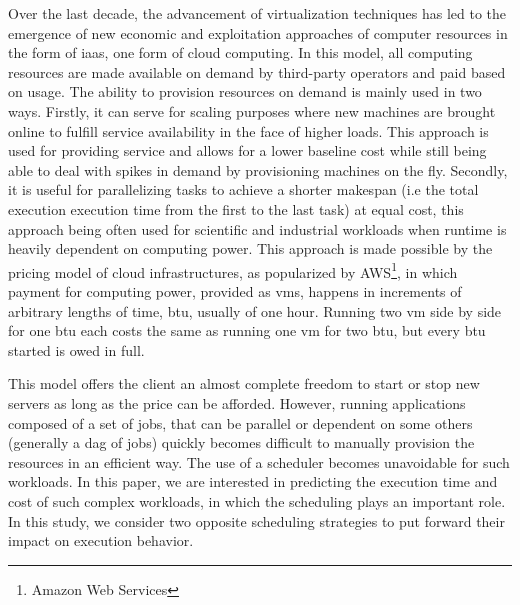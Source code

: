 \documentclass[10pt,conference,compsocconf]{IEEEtran}
\begin{document}
Over the  last decade, the advancement  of virtualization techniques has  led to
the emergence of new economic  and exploitation approaches of computer resources
in  the form  of \ac{iaas},  one form  of cloud  computing. In  this model,  all
computing resources  are made available  on demand by third-party  operators and
paid based  on usage.  The  ability to provision  resources on demand  is mainly
used in two ways.  Firstly, it can serve for scaling purposes where new machines
are  brought online  to  fulfill  service availability  in  the  face of  higher
loads.  This approach  is used  for  providing service  and allows  for a  lower
baseline  cost  while  still  being  able  to deal  with  spikes  in  demand  by
provisioning machines on the fly. Secondly, it is useful for parallelizing tasks
to achieve a  shorter makespan (i.e the total execution  execution time from the
first  to the  last task)  at equal  cost, this  approach being  often used  for
scientific  and  industrial  workloads  when runtime  is  heavily  dependent  on
computing power.  This  approach is made possible by the  pricing model of cloud
infrastructures, as  popularized by AWS\footnote{Amazon Web  Services}, in which
payment  for computing  power, provided  as \acp{vm},  happens in  increments of
arbitrary lengths  of time, \ac{btu}, usually  of one hour. Running  two \ac{vm}
side by side for one \ac{btu} each costs the same as running one \ac{vm} for two
\ac{btu}, but every \ac{btu} started is owed in full.

This model  offers the client  an almost complete freedom  to start or  stop new
servers as  long as  the price  can be  afforded. However,  running applications
composed of  a set of  jobs, that  can be parallel  or dependent on  some others
(generally a \ac{dag}  of jobs) quickly becomes difficult  to manually provision
the resources  in an efficient way.  The use of a  scheduler becomes unavoidable
for  such  workloads.  In  this  paper,  we  are  interested in  predicting  the
execution time and cost of such complex workloads, in which the scheduling plays
an  important  role.   In  this  study,  we  consider  two  opposite  scheduling
strategies to put forward their impact  on execution behavior. 
\end{document}
